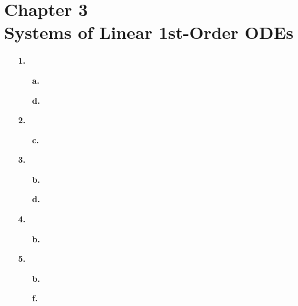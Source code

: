 
\section{Chapter 3\\{\large Systems of Linear 1st-Order ODEs}}

\begin{enumerate}
	\setlength{\itemsep}{\bigskipamount}
	\item[\textbf{1.}]
		\begin{enumerate}
			\item[\textbf{a.}]


			\item[\textbf{d.}]


		\end{enumerate}


	\item[\textbf{2.}]
		\begin{enumerate}
			\item[\textbf{c.}]


		\end{enumerate}


	\item[\textbf{3.}]
		\begin{enumerate}
			\item[\textbf{b.}]


			\item[\textbf{d.}]


		\end{enumerate}


	\item[\textbf{4.}]
		\begin{enumerate}
			\item[\textbf{b.}]


		\end{enumerate}


	\item[\textbf{5.}]
		\begin{enumerate}
			\item[\textbf{b.}]


			\item[\textbf{f.}]


		\end{enumerate}


\end{enumerate}